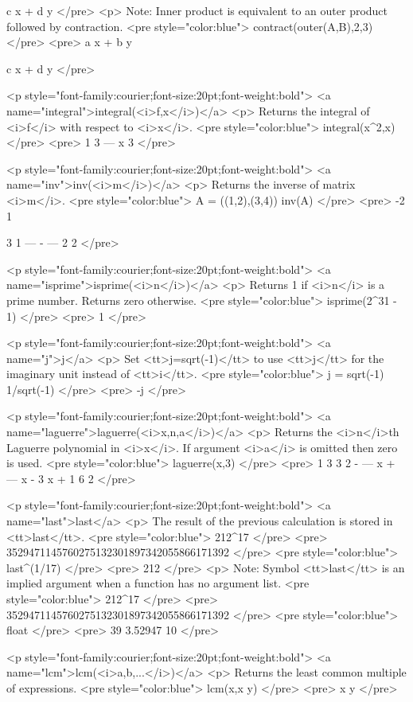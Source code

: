 c x + d y
</pre>
<p>
Note: Inner product is equivalent to an outer product followed by contraction.
<pre style="color:blue">
contract(outer(A,B),2,3)
</pre>
<pre>
a x + b y

c x + d y
</pre>

<p style="font-family:courier;font-size:20pt;font-weight:bold">
<a name="integral">integral(<i>f,x</i>)</a>
<p>
Returns the integral of <i>f</i> with respect to <i>x</i>.
<pre style="color:blue">
integral(x^2,x)
</pre>
<pre>
 1   3
--- x
 3
</pre>

<p style="font-family:courier;font-size:20pt;font-weight:bold">
<a name="inv">inv(<i>m</i>)</a>
<p>
Returns the inverse of matrix <i>m</i>.
<pre style="color:blue">
A = ((1,2),(3,4))
inv(A)
</pre>
<pre>
 -2       1


  3        1
 ---    - ---
  2        2
</pre>

<p style="font-family:courier;font-size:20pt;font-weight:bold">
<a name="isprime">isprime(<i>n</i>)</a>
<p>
Returns 1 if <i>n</i> is a prime number. Returns zero otherwise.
<pre style="color:blue">
isprime(2^31 - 1)
</pre>
<pre>
1
</pre>

<p style="font-family:courier;font-size:20pt;font-weight:bold">
<a name="j">j</a>
<p>
Set <tt>j=sqrt(-1)</tt> to use <tt>j</tt> for the imaginary unit instead of <tt>i</tt>.
<pre style="color:blue">
j = sqrt(-1)
1/sqrt(-1)
</pre>
<pre>
-j
</pre>

<p style="font-family:courier;font-size:20pt;font-weight:bold">
<a name="laguerre">laguerre(<i>x,n,a</i>)</a>
<p>
Returns the <i>n</i>th Laguerre polynomial in <i>x</i>.
If argument <i>a</i> is omitted then zero is used.
<pre style="color:blue">
laguerre(x,3)
</pre>
<pre>
   1   3    3   2
- --- x  + --- x  - 3 x + 1
   6        2
</pre>

<p style="font-family:courier;font-size:20pt;font-weight:bold">
<a name="last">last</a>
<p>
The result of the previous calculation is stored in <tt>last</tt>.
<pre style="color:blue">
212^17
</pre>
<pre>
3529471145760275132301897342055866171392
</pre>
<pre style="color:blue">
last^(1/17)
</pre>
<pre>
212
</pre>
<p>
Note: Symbol <tt>last</tt> is an implied argument when a function has no
argument list.
<pre style="color:blue">
212^17
</pre>
<pre>
3529471145760275132301897342055866171392
</pre>
<pre style="color:blue">
float
</pre>
<pre>
          39
3.52947 10
</pre>

<p style="font-family:courier;font-size:20pt;font-weight:bold">
<a name="lcm">lcm(<i>a,b,...</i>)</a>
<p>
Returns the least common multiple of expressions.
<pre style="color:blue">
lcm(x,x y)
</pre>
<pre>
x y
</pre>

